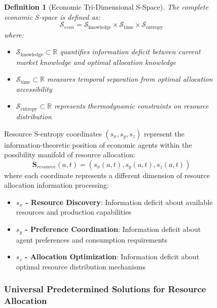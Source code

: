 \documentclass[12pt,a4paper]{article}
\newtheorem{definition}[theorem]{Definition}
\begin{document}
\begin{figure}[H]
\begin{definition}[Economic Tri-Dimensional S-Space]
The complete economic S-space is defined as:
\begin{equation}
\mathcal{S}_{econ} = \mathcal{S}_{\text{knowledge}} \times \mathcal{S}_{\text{time}} \times \mathcal{S}_{\text{entropy}}
\end{equation}
where:
\begin{itemize}
\item $\mathcal{S}_{\text{knowledge}} \subset \mathbb{R}$ quantifies information deficit between current market knowledge and optimal allocation knowledge
\item $\mathcal{S}_{\text{time}} \subset \mathbb{R}$ measures temporal separation from optimal allocation accessibility  
\item $\mathcal{S}_{\text{entropy}} \subset \mathbb{R}$ represents thermodynamic constraints on resource distribution
\end{itemize}
\end{definition}

Resource S-entropy coordinates $(s_x, s_y, s_z)$ represent the information-theoretic position of economic agents within the possibility manifold of resource allocation:
\begin{equation}
\mathbf{S}_{resource}(a,t) = (s_x(a,t), s_y(a,t), s_z(a,t))
\end{equation}
where each coordinate represents a different dimension of resource allocation information processing:
\begin{itemize}
\item \textbf{$s_x$ - Resource Discovery}: Information deficit about available resources and production capabilities
\item \textbf{$s_y$ - Preference Coordination}: Information deficit about agent preferences and consumption requirements  
\item \textbf{$s_z$ - Allocation Optimization}: Information deficit about optimal resource distribution mechanisms
\end{itemize}

\subsubsection{Universal Predetermined Solutions for Resource Allocation}


\end{figure}
\end{document}
